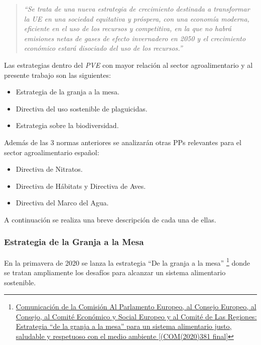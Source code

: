 \documentclass[a4paper, nobind]{templates/ociamthesis}
\providecommand{\tightlist}{%
  \setlength{\itemsep}{0pt}\setlength{\parskip}{0pt}}
\begin{document}
\begin{quote}
\emph{``Se trata de una nueva estrategia de crecimiento destinada a
transformar la UE en una sociedad equitativa y próspera, con una
economía moderna, eficiente en el uso de los recursos y competitiva,
en la que no habrá emisiones netas de gases de efecto invernadero en
2050 y el crecimiento económico estará disociado del uso de los
recursos.''}
\end{quote}

Las estrategias dentro del \emph{PVE} con mayor relación al sector
agroalimentario y al presente trabajo son las siguientes:

\begin{itemize}
\tightlist
\item
  Estrategia de la granja a la mesa.
\item
  Directiva del uso sostenible de plaguicidas.
\item
  Estrategia sobre la biodiversidad.
\end{itemize}

Además de las 3 normas anteriores se analizarán otras PPs relevantes
para el sector agroalimentario español:

\begin{itemize}
\tightlist
\item
  Directiva de Nitratos.
\item
  Directiva de Hábitats y Directiva de Aves.
\item
  Directiva del Marco del Agua.
\end{itemize}

A continuación se realiza una breve descripción de cada una de ellas.

\hypertarget{granja-mesa}{%
\subsubsection{Estrategia de la Granja a la Mesa}\label{granja-mesa}}

En la primavera de 2020 se lanza la estrategia ``De la granja a la mesa''
\footnote{\href{https://eur-lex.europa.eu/legal-content/ES/TXT/?qid=1693563760418&uri=CELEX\%3A52020DC0381}{Comunicación de la Comisión Al Parlamento
  Europeo, al Consejo Europeo, al Consejo, al Comité Económico y
  Social Europeo y al Comité de Las Regiones: Estrategia ``de la granja
  a la mesa'' para un sistema alimentario justo, saludable y respetuoso
  con el medio ambiente {[}(COM(2020)381
  final{]}}} donde se tratan ampliamente los desafíos para
alcanzar un sistema alimentario sostenible.\\
\end{document}
